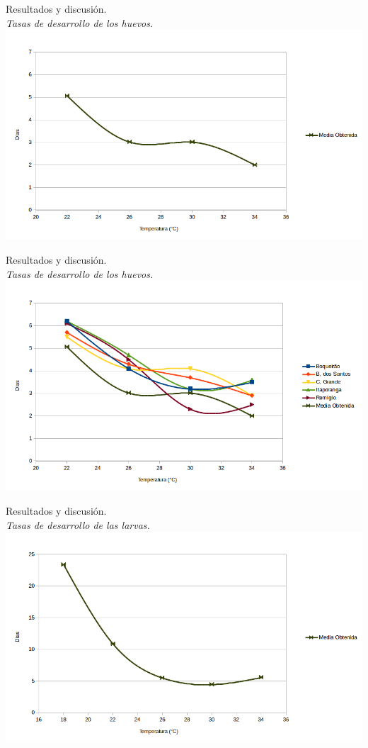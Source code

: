 \begin{frame}[t]{Resultados y discusión.\\\textit{Tasas de desarrollo de los huevos.}}
    \includegraphics[width=\textwidth]{./graphics/huevos-desarrollo-single.png}
\end{frame}

\begin{frame}[t]{Resultados y discusión.\\\textit{Tasas de desarrollo de los huevos.}}
    \includegraphics[width=\textwidth]{./graphics/huevos-desarrollo.png}
\end{frame}

\begin{frame}[t]{Resultados y discusión.\\\textit{Tasas de desarrollo de las larvas.}}
    \includegraphics[width=\textwidth]{./graphics/larvas-desarrollo-single.png}
\end{frame}

